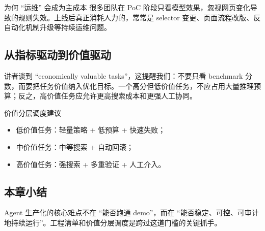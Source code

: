 \begin{knowledgebox}{为何 ``运维'' 会成为主成本}
很多团队在 PoC 阶段只看模型效果，忽视网页变化导致的规则失效。上线后真正消耗人力的，常常是 selector 变更、页面流程改版、反自动化机制升级等持续运维问题。
\end{knowledgebox}

\subsection{从指标驱动到价值驱动}
讲者谈到 ``economically valuable tasks''，这提醒我们：不要只看 benchmark 分数，而要把任务价值纳入优化目标。一个高分但低价值任务，不应占用大量推理预算；反之，高价值任务应允许更高搜索成本和更强人工协同。

\begin{importantbox}{价值分层调度建议}
\begin{itemize}
    \item 低价值任务：轻量策略 + 低预算 + 快速失败；
    \item 中价值任务：中等搜索 + 自动回滚；
    \item 高价值任务：强搜索 + 多重验证 + 人工介入。
\end{itemize}
\end{importantbox}

\subsection{本章小结}
Agent 生产化的核心难点不在 ``能否跑通 demo''，而在 ``能否稳定、可控、可审计地持续运行''。工程清单和价值分层调度是跨过这道门槛的关键抓手。

